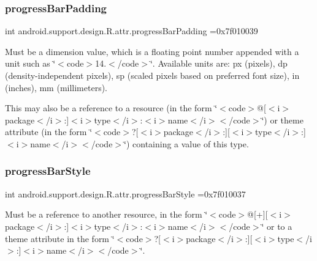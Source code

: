 \subsubsection{\texorpdfstring{progress\+Bar\+Padding}{progressBarPadding}}
{\footnotesize\ttfamily int android.\+support.\+design.\+R.\+attr.\+progress\+Bar\+Padding =0x7f010039\hspace{0.3cm}{\ttfamily [static]}}

Must be a dimension value, which is a floating point number appended with a unit such as \char`\"{}$<$code$>$14.\+5sp$<$/code$>$\char`\"{}. Available units are\+: px (pixels), dp (density-\/independent pixels), sp (scaled pixels based on preferred font size), in (inches), mm (millimeters). 

This may also be a reference to a resource (in the form \char`\"{}$<$code$>$@\mbox{[}$<$i$>$package$<$/i$>$\+:\mbox{]}$<$i$>$type$<$/i$>$\+:$<$i$>$name$<$/i$>$$<$/code$>$\char`\"{}) or theme attribute (in the form \char`\"{}$<$code$>$?\mbox{[}$<$i$>$package$<$/i$>$\+:\mbox{]}\mbox{[}$<$i$>$type$<$/i$>$\+:\mbox{]}$<$i$>$name$<$/i$>$$<$/code$>$\char`\"{}) containing a value of this type. \mbox{\label{classandroid_1_1support_1_1design_1_1R_1_1attr_a6cda284efed118d0df86a70fe310133d}} 
\subsubsection{\texorpdfstring{progress\+Bar\+Style}{progressBarStyle}}
{\footnotesize\ttfamily int android.\+support.\+design.\+R.\+attr.\+progress\+Bar\+Style =0x7f010037\hspace{0.3cm}{\ttfamily [static]}}

Must be a reference to another resource, in the form \char`\"{}$<$code$>$@\mbox{[}+\mbox{]}\mbox{[}$<$i$>$package$<$/i$>$\+:\mbox{]}$<$i$>$type$<$/i$>$\+:$<$i$>$name$<$/i$>$$<$/code$>$\char`\"{} or to a theme attribute in the form \char`\"{}$<$code$>$?\mbox{[}$<$i$>$package$<$/i$>$\+:\mbox{]}\mbox{[}$<$i$>$type$<$/i$>$\+:\mbox{]}$<$i$>$name$<$/i$>$$<$/code$>$\char`\"{}. \mbox{\label{classandroid_1_1support_1_1design_1_1R_1_1attr_aac7f3cc9efb220e9fa9bfe562916b922}} 
